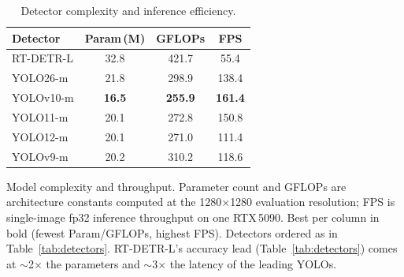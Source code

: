 \begin{table}[ht]
  \centering
  \caption{Detector complexity and inference efficiency.}
  \label{tab:efficiency}
  \begin{tabular}{lccc}
    \toprule
    Detector & Param\,(M) & GFLOPs & FPS \\
    \midrule
    RT-DETR-L & 32.8 & 421.7 & 55.4 \\
    YOLO26-m & 21.8 & 298.9 & 138.4 \\
    YOLOv10-m & \textbf{16.5} & \textbf{255.9} & \textbf{161.4} \\
    YOLO11-m & 20.1 & 272.8 & 150.8 \\
    YOLO12-m & 20.1 & 271.0 & 111.4 \\
    YOLOv9-m & 20.2 & 310.2 & 118.6 \\
    \bottomrule
  \end{tabular}
  \par\smallskip
  \footnotesize Model complexity and throughput. Parameter count and GFLOPs are architecture constants computed at the 1280$\times$1280 evaluation resolution; FPS is single-image fp32 inference throughput on one RTX\,5090. Best per column in bold (fewest Param/GFLOPs, highest FPS). Detectors ordered as in Table~\ref{tab:detectors}. RT-DETR-L's accuracy lead (Table~\ref{tab:detectors}) comes at $\sim$2$\times$ the parameters and $\sim$3$\times$ the latency of the leading YOLOs.
\end{table}
